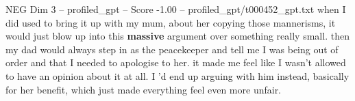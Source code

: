 \begin{textsample}{NEG Dim 3 – profiled\_gpt – Score -1.00 – profiled\_gpt/t000452\_gpt.txt}  \label{ex:f3_neg_027}
when I did used to bring it up with my mum, about her copying those mannerisms, it would just blow up into this \textbf{massive} argument over something really small. then my dad would always step in as the peacekeeper and tell me I was being out of order and that I needed to apologise to her. it made me feel like I wasn't allowed to have an opinion about it at all.
I ’d end up arguing with him instead, basically for her benefit, which just made everything feel even more unfair.

\end{textsample}

